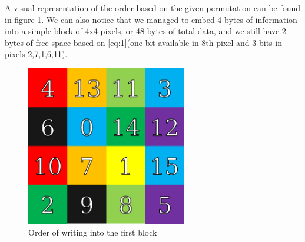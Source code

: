 A visual representation of the order based on the given permutation can be found in figure \ref{scramble_example_first_block}. We can also notice that we managed to embed 4 bytes of information into a simple block of 4x4 pixels, or 48 bytes of total data, and we still have 2 bytes of free space based on \ref{eq:1}(one bit available in 8th pixel and 3 bits in pixels 2,7,1,6,11).

\begin{figure}[H]
    \centering
    \includegraphics[width=7cm,keepaspectratio]{pics/bmp_scrambling/first_block_marked}
    \caption{Order of writing into the first block}
    \label{scramble_example_first_block}
\end{figure}


